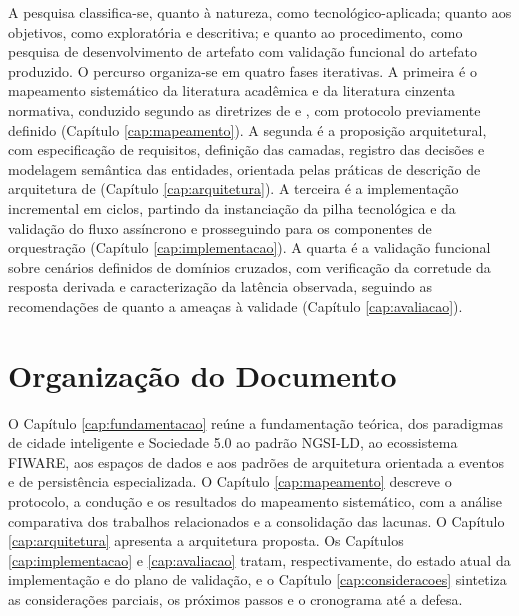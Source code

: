 A pesquisa classifica-se, quanto à natureza, como tecnológico-aplicada; quanto aos objetivos, como exploratória e descritiva; e quanto ao procedimento, como pesquisa de desenvolvimento de artefato com validação funcional do artefato produzido. O percurso organiza-se em quatro fases iterativas. A primeira é o mapeamento sistemático da literatura acadêmica e da literatura cinzenta normativa, conduzido segundo as diretrizes de  e , com protocolo previamente definido (Capítulo \ref{cap:mapeamento}). A segunda é a proposição arquitetural, com especificação de requisitos, definição das camadas, registro das decisões e modelagem semântica das entidades, orientada pelas práticas de descrição de arquitetura de  (Capítulo \ref{cap:arquitetura}). A terceira é a implementação incremental em ciclos, partindo da instanciação da pilha tecnológica e da validação do fluxo assíncrono e prosseguindo para os componentes de orquestração (Capítulo \ref{cap:implementacao}). A quarta é a validação funcional sobre cenários definidos de domínios cruzados, com verificação da corretude da resposta derivada e caracterização da latência observada, seguindo as recomendações de  quanto a ameaças à validade (Capítulo \ref{cap:avaliacao}).

\section{Organização do Documento}
\label{sec:organizacao}

O Capítulo \ref{cap:fundamentacao} reúne a fundamentação teórica, dos paradigmas de cidade inteligente e Sociedade 5.0 ao padrão NGSI-LD, ao ecossistema FIWARE, aos espaços de dados e aos padrões de arquitetura orientada a eventos e de persistência especializada. O Capítulo \ref{cap:mapeamento} descreve o protocolo, a condução e os resultados do mapeamento sistemático, com a análise comparativa dos trabalhos relacionados e a consolidação das lacunas. O Capítulo \ref{cap:arquitetura} apresenta a arquitetura proposta. Os Capítulos \ref{cap:implementacao} e \ref{cap:avaliacao} tratam, respectivamente, do estado atual da implementação e do plano de validação, e o Capítulo \ref{cap:consideracoes} sintetiza as considerações parciais, os próximos passos e o cronograma até a defesa.
